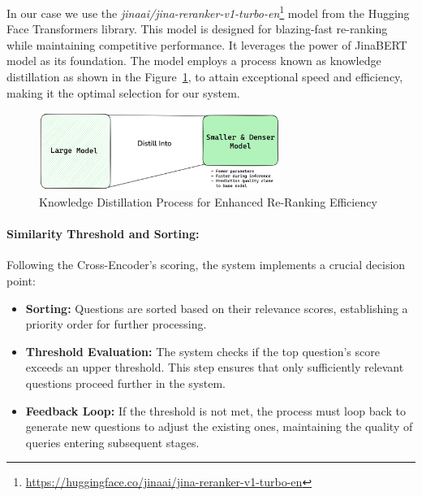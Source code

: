 In our case we use the \textit{jinaai/jina-reranker-v1-turbo-en}\footnote{\url{https://huggingface.co/jinaai/jina-reranker-v1-turbo-en}} model from the Hugging Face Transformers library.
This model is designed for blazing-fast re-ranking while maintaining competitive performance.
It leverages the power of JinaBERT~\cite{günther2024jinaembeddings28192token} model as its foundation.
The model employs a process known as knowledge distillation as shown in the Figure~\ref{fig:knowledge-distill}, to attain exceptional speed and efficiency, making it the optimal selection for our system.

\begin{figure}[ht!]
    \centering
    \begin{minipage}[b]{\textwidth}
        \centering
        \includegraphics[width=0.7\textwidth]{res/knowledge-distill}
    \end{minipage}
    \caption{Knowledge Distillation Process for Enhanced Re-Ranking Efficiency}
    \label{fig:knowledge-distill}
\end{figure}

\paragraph{Similarity Threshold and Sorting:}\label{par:relevance-threshold-and-sorting}
Following the Cross-Encoder's scoring, the system implements a crucial decision point:
\begin{itemize}
    \item \textbf{Sorting:} Questions are sorted based on their relevance scores, establishing a priority order for further processing.
    \item \textbf{Threshold Evaluation:} The system checks if the top question's score exceeds an upper threshold. This step ensures that only sufficiently relevant questions proceed further in the system.
    \item \textbf{Feedback Loop:} If the threshold is not met, the process must loop back to generate new questions to adjust the existing ones, maintaining the quality of queries entering subsequent stages.
\end{itemize}

